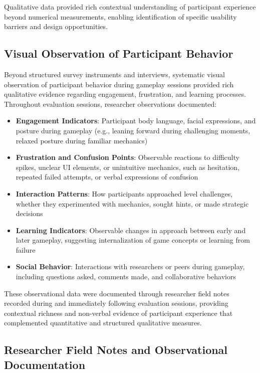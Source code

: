 Qualitative data provided rich contextual understanding of participant experience beyond numerical measurements, enabling identification of specific usability barriers and design opportunities.

\subsection{Visual Observation of Participant Behavior}

Beyond structured survey instruments and interviews, systematic visual observation of participant behavior during gameplay sessions provided rich qualitative evidence regarding engagement, frustration, and learning processes. Throughout evaluation sessions, researcher observations documented:

\begin{itemize}
    \item \textbf{Engagement Indicators}: Participant body language, facial expressions, and posture during gameplay (e.g., leaning forward during challenging moments, relaxed posture during familiar mechanics)
    \item \textbf{Frustration and Confusion Points}: Observable reactions to difficulty spikes, unclear UI elements, or unintuitive mechanics, such as hesitation, repeated failed attempts, or verbal expressions of confusion
    \item \textbf{Interaction Patterns}: How participants approached level challenges, whether they experimented with mechanics, sought hints, or made strategic decisions
    \item \textbf{Learning Indicators}: Observable changes in approach between early and later gameplay, suggesting internalization of game concepts or learning from failure
    \item \textbf{Social Behavior}: Interactions with researchers or peers during gameplay, including questions asked, comments made, and collaborative behaviors
\end{itemize}

These observational data were documented through researcher field notes recorded during and immediately following evaluation sessions, providing contextual richness and non-verbal evidence of participant experience that complemented quantitative and structured qualitative measures.

\subsection{Researcher Field Notes and Observational Documentation}

